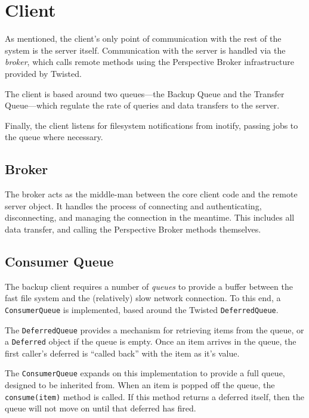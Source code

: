 \section{Client}
\label{sec:implementation-client}

As mentioned, the client's only point of communication with the rest of the
system is the server itself. Communication with the server is handled via the
\emph{broker}, which calls remote methods using the Perspective Broker
infrastructure provided by Twisted.

The client is based around two queues---the Backup Queue and the Transfer
Queue---which regulate the rate of queries and data transfers to the server.

Finally, the client listens for filesystem notifications from inotify, passing
jobs to the queue where necessary.

\subsection{Broker}
\label{sec:implementation-client-broker}

The broker acts as the middle-man between the core client code and the remote
server object. It handles the process of connecting and authenticating,
disconnecting, and managing the connection in the meantime. This includes all
data transfer, and calling the Perspective Broker methods themselves.

\subsection{Consumer Queue}
\label{sec:implementation-client-consumerqueue}

The backup client requires a number of \emph{queues} to provide a buffer
between the fast file system and the (relatively) slow network connection. To
this end, a \verb!ConsumerQueue! is implemented, based around the Twisted
\verb!DeferredQueue!.

The \verb!DeferredQueue! provides a mechanism for retrieving items from the
queue, or a \verb!Deferred! object if the queue is empty. Once an item arrives
in the queue, the first caller's deferred is ``called back'' with the item as
it's value.

The \verb!ConsumerQueue! expands on this implementation to provide a full
queue, designed to be inherited from. When an item is popped off the queue, the
\verb!consume(item)! method is called. If this method returns a deferred
itself, then the queue will not move on until that deferred has fired.

